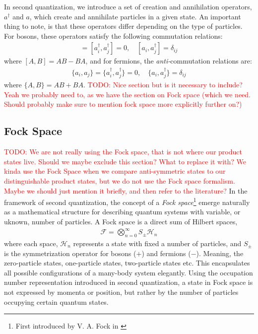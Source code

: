 \documentclass{subfiles}
\begin{document}
In second quantization, we introduce a set of creation and annihilation operators, $a^\dagger$ and $a$, which create and annihilate particles in a given state. An important thing to note, is that these operators differ depending on the type of particles. For bosons, these operators satisfy the following commutation relations:
\begin{align}
    [a_i, a_j] = [a^\dagger_i, a^\dagger_j] = 0, \quad [a_i, a^\dagger_j] = \delta_{ij}\label{eq:commutation}
\end{align}
where $[A, B] = AB - BA$, and for fermions, the \emph{anti-}commutation relations are:
\begin{align}
    \{a_i, a_j\} = \{a^\dagger_i, a^\dagger_j\} = 0, \quad \{a_i, a^\dagger_j\} = \delta_{ij}\label{eq:anti_commutation}
\end{align}
where $\{A, B\} = AB + BA$.
\textcolor{red}{TODO: Nice section but is it necessary to include? Yeah we probably need to, as we have the section on Fock space (which we need. Should probably make sure to mention fock space more explicitly further on?)}
\subsection{Fock Space}\textcolor{red}{TODO: We are not really using the Fock space, that is not where our product states live. Should we maybe exclude this section? What to replace it with? We kinda use the Fock Space when we compare anti-symmetric states to our distinguishable product states, but we do not use the Fock space formalism. Maybe we should just mention it briefly, and then refer to the literature?}
In the framework of second quantization, the concept of a \emph{Fock space}\footnote{First introduced by V. A. Fock in \cite{fock1932konfigurationsraum}} emerge naturally as a mathematical structure for describing quantum systems with variable, or uknown, number of particles. A Fock space is a direct sum of Hilbert spaces, 
\begin{align*}
    \mathcal{F} = \bigotimes_{n=0}^\infty S_{\pm} \mathcal{H}_n
\end{align*}
where each space, $\mathcal{H}_n$ represents a state with fixed a number of particles, and $S_{\pm}$ is the symmetrization operator for bosons ($+$) and fermions ($-$). Meaning, the zero-particle states, one-particle states, two-particle states etc. This encapsulates all possible configurations of a many-body system elegantly. Using the occupation number representation introduced in second quantization, a state in Fock space is not expressed by momenta or position, but rather by the number of particles occupying certain quantum states\cite{helgaker2013molecular}. 
\\
\end{document}
